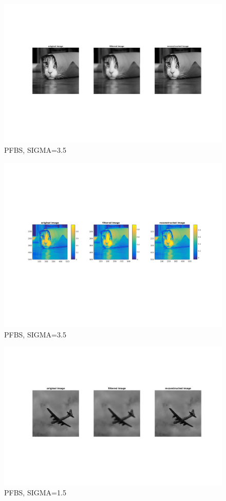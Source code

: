 \documentclass[a4paper, UTF8]{ctexrep}
\begin{document}
			\begin{figure}[h]
				\centering
				\includegraphics[width=\textwidth]{hw4_fig9.png}
				\caption{PFBS, SIGMA=3.5}
				\label{fig:figure1}
			\end{figure}
			\clearpage
			\begin{figure}[h]
				\centering
				\includegraphics[width=\textwidth]{hw4_fig10.png}
				\caption{PFBS, SIGMA=3.5}
				\label{fig:figure1}
			\end{figure}
			\clearpage
			\begin{figure}[h]
				\centering
				\includegraphics[width=\textwidth]{hw4_fig11.png}
				\caption{PFBS, SIGMA=1.5}
				\label{fig:figure1}
			\end{figure}
\end{document}
